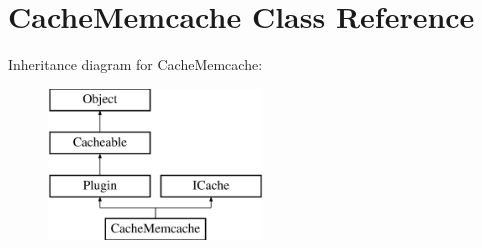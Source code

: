 \hypertarget{class_cache_memcache}{\section{Cache\-Memcache Class Reference}
\label{class_cache_memcache}
}
Inheritance diagram for Cache\-Memcache\-:\begin{figure}[H]
\begin{center}
\leavevmode
\includegraphics[height=4.000000cm]{class_cache_memcache}
\end{center}
\end{figure}
